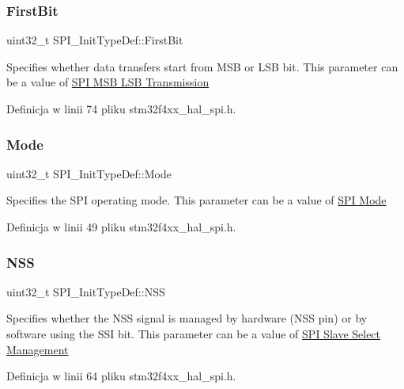 \subsubsection{\texorpdfstring{First\+Bit}{FirstBit}}
{\footnotesize\ttfamily uint32\+\_\+t S\+P\+I\+\_\+\+Init\+Type\+Def\+::\+First\+Bit}

Specifies whether data transfers start from M\+SB or L\+SB bit. This parameter can be a value of \hyperlink{group___s_p_i___m_s_b___l_s_b__transmission}{S\+PI M\+SB L\+SB Transmission} 

Definicja w linii 74 pliku stm32f4xx\+\_\+hal\+\_\+spi.\+h.

\mbox{\label{struct_s_p_i___init_type_def_a5247eb0463437c9980a9d4a5300b50a5}} 
\subsubsection{\texorpdfstring{Mode}{Mode}}
{\footnotesize\ttfamily uint32\+\_\+t S\+P\+I\+\_\+\+Init\+Type\+Def\+::\+Mode}

Specifies the S\+PI operating mode. This parameter can be a value of \hyperlink{group___s_p_i___mode}{S\+PI Mode} 

Definicja w linii 49 pliku stm32f4xx\+\_\+hal\+\_\+spi.\+h.

\mbox{\label{struct_s_p_i___init_type_def_aed541d17808213ac6f90ac7deb2bec5f}} 
\subsubsection{\texorpdfstring{N\+SS}{NSS}}
{\footnotesize\ttfamily uint32\+\_\+t S\+P\+I\+\_\+\+Init\+Type\+Def\+::\+N\+SS}

Specifies whether the N\+SS signal is managed by hardware (N\+SS pin) or by software using the S\+SI bit. This parameter can be a value of \hyperlink{group___s_p_i___slave___select__management}{S\+PI Slave Select Management} 

Definicja w linii 64 pliku stm32f4xx\+\_\+hal\+\_\+spi.\+h.

\mbox{\label{struct_s_p_i___init_type_def_a60db7e87bb66775df6213e4006dfd876}} 
